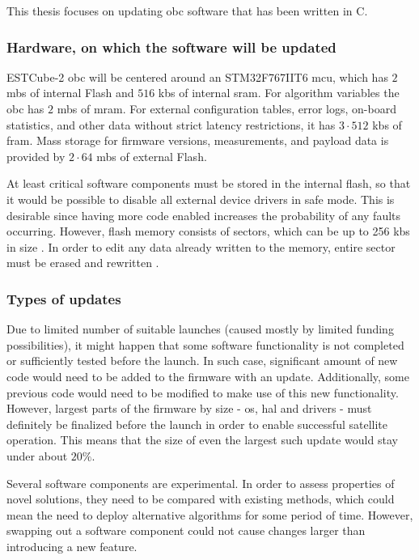 This thesis focuses on updating \gls{obc} software that has been written in C.

\subsubsection{Hardware, on which the software will be updated}\label{s:hardware}

ESTCube-2 \gls{obc} will be centered around an STM32F767IIT6 \gls{mcu}, which has $2$ \glspl{mb} of internal Flash and $516$ \glspl{kb} of internal \gls{sram}. For algorithm variables the \gls{obc} has $2$ \glspl{mb} of \gls{mram}. For external configuration tables, error logs, on-board statistics, and other data without strict latency restrictions, it has $3\cdot512$ \glspl{kb} of \gls{fram}. Mass storage for firmware versions, measurements, and payload data is provided by $2\cdot64$ \glspl{mb} of external Flash.
\cite{Haljaste2017}

At least critical software components must be stored in the internal flash, so that it would be possible to disable all external device drivers in safe mode. This is desirable since having more code enabled increases the probability of any faults occurring. However, flash memory consists of sectors, which can be up to 256 \glspl{kb} in size \cite{STMicroelectronics2018}. In order to edit any data already written to the memory, entire sector must be erased and rewritten \cite{STMicroelectronics2018}.

\subsubsection{Types of updates}

Due to limited number of suitable launches (caused mostly by limited funding possibilities), it might happen that some software functionality is not completed or sufficiently tested before the launch. In such case, significant amount of new code would need to be added to the firmware with an update. Additionally, some previous code would need to be modified to make use of this new functionality. However, largest parts of the firmware by size - \gls{os}, \gls{hal} and drivers - must definitely be finalized before the launch in order to enable successful satellite operation. This means that the size of even the largest such update would stay under about $20\%$.

Several software components are experimental. In order to assess properties of novel solutions, they need to be compared with existing methods, which could mean the need to deploy alternative algorithms for some period of time. However, swapping out a software component could not cause changes larger than introducing a new feature.

